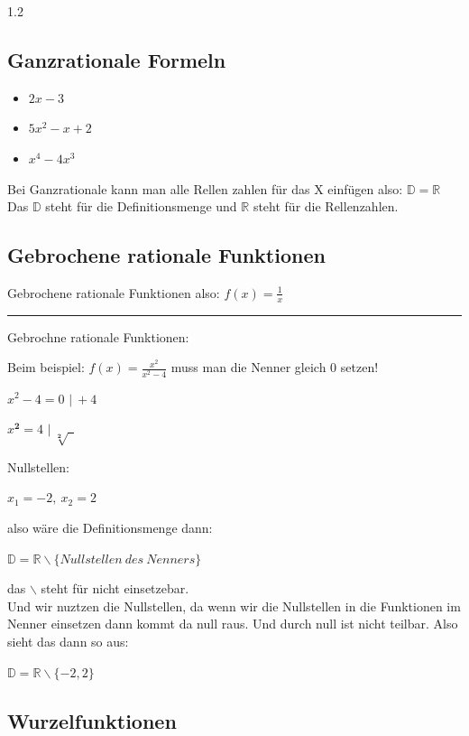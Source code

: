 \documentclass{article}
\newcommand{\Zeilenabstand}{1.2}
\newcommand{\absatz}{5mm}
\newcommand{\strich}{\vspace{\absatz}\hrule\vspace{\absatz}}
\begin{document}
\begin{spacing}{\Zeilenabstand}
    \subsection{Ganzrationale Formeln}

    \begin{itemize}
        \item[$\Rightarrow$] $2x-3$
        \item[$\Rightarrow$] $5x^2-x+2$
        \item[$\Rightarrow$] $x^4-4x^3$
    \end{itemize}

    Bei Ganzrationale kann man alle Rellen zahlen für das X einfügen also:
    $\mathbb{D} = \mathbb{R}$ 
    Das $\mathbb{D}$ steht für die Definitionsmenge und $\mathbb{R}$ steht für die Rellenzahlen.


    \subsection{Gebrochene rationale Funktionen}

    Gebrochene rationale Funktionen also: $f(x)=\frac{1}{x}$

    \strich\hfill

    Gebrochne rationale Funktionen:

    Beim beispiel: $f(x)=\frac{x^2}{x^2-4}$ muss man die Nenner gleich 0 setzen!

    $x^2 -4 =0$ $\vert \ +4$

    $x^\mathbf{2} = 4$ $\vert \ \sqrt[\mathbf{2}]{\ \ }$

    Nullstellen:

    $x_1 = -2, \  x_2 = 2$

    also wäre die Definitionsmenge dann:

    $\mathbb{D} = \mathbb{R} \backslash \{ Nullstellen \ des \ Nenners\}$


    das $\backslash$ steht für nicht einsetzebar.\\
    Und wir nuztzen die Nullstellen, da wenn wir die Nullstellen in die Funktionen im Nenner einsetzen dann kommt da null raus. Und durch null ist nicht teilbar. Also sieht das dann so aus:


    $\mathbb{D} = \mathbb{R} \backslash \{-2,2\}$

    \subsection{Wurzelfunktionen}


\end{spacing}
\end{document}

